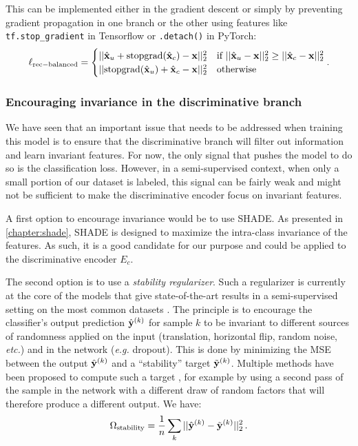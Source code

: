 This can be implemented either in the gradient descent or simply by preventing gradient propagation in one branch or the other using features like \texttt{tf.stop\_gradient} in Tensorflow or \texttt{.detach()} in PyTorch:
\begin{equation}
	\mathcal \ell_\mathrm{rec-balanced} = \begin{cases}
    	||\hat{\mathbf{x}}_u + \mathrm{stopgrad}(\hat{\mathbf{x}}_c) - \mathbf{x}||_2^2&\text{if }||\hat{\mathbf{x}}_u - \mathbf{x}||_2^2 \geq ||\hat{\mathbf{x}}_c - \mathbf{x}||_2^2\\
        ||\mathrm{stopgrad}(\hat{\mathbf{x}}_u) + \hat{\mathbf{x}}_c - \mathbf{x}||_2^2&\text{otherwise}\\
    \end{cases} .
\end{equation}

\subsubsection{Encouraging invariance in the discriminative branch}

We have seen that an important issue that needs to be addressed when training this model is to ensure that the discriminative branch will filter out information and learn invariant features. For now, the only signal that pushes the model to do so is the classification loss. However, in a semi-supervised context, when only a small portion of our dataset is labeled, this signal can be fairly weak and might not be sufficient to make the discriminative encoder focus on invariant features.

A first option to encourage invariance would be to use \ac{SHADE}. As presented in \autoref{chapter:shade}, \ac{SHADE} is designed to maximize the intra-class invariance of the features. As such, it is a good candidate for our purpose and could be applied to the discriminative encoder $E_c$.
 
The second option is to use a \textit{stability regularizer}. Such a regularizer is currently at the core of the models that give state-of-the-art results in a semi-supervised setting on the most common datasets \citep{Sajjadi2016,Laine2016,Tarvainen2017}. The principle is to encourage the classifier's output prediction $\hat{\mathbf{y}}^{(k)}$ for sample $k$ to be invariant to different sources of randomness applied on the input (translation, horizontal flip, random noise, \textit{etc.}) and in the network (\textit{e.g.} dropout). This is done by minimizing the \ac{MSE} between the output $\hat{\mathbf{y}}^{(k)}$ and a ``stability'' target $\tilde{\mathbf{y}}^{(k)}$. Multiple methods have been proposed to compute such a target \citep{Sajjadi2016,Laine2016,Tarvainen2017}, for example by using a second pass of the sample in the network with a different draw of random factors that will therefore produce a different output. We have:
\begin{equation}
	\Omega_\mathrm{stability} = \frac{1}{n} \sum_k ||\hat{\mathbf{y}}^{(k)} - \tilde{\mathbf{y}}^{(k)}||_2^2\,.
\end{equation}


